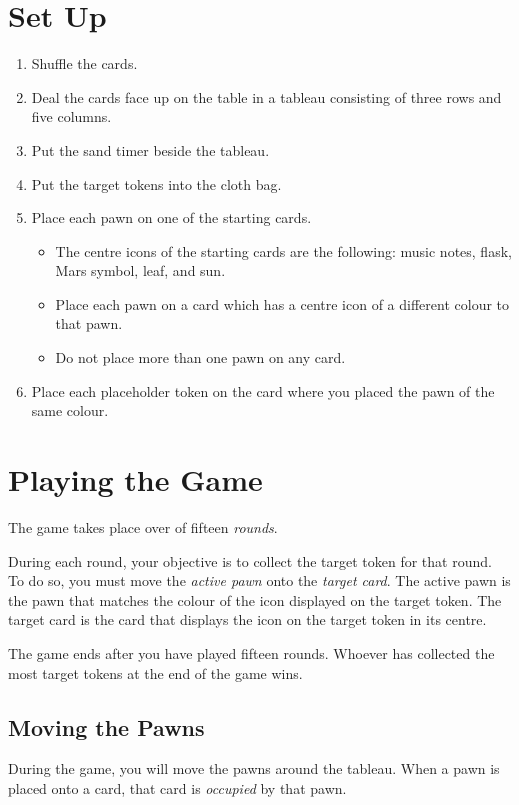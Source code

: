 \documentclass[a6paper, parskip=half, DIV=14, 10pt]{scrartcl}
\begin{document}
\section*{Set Up}
\begin{enumerate}[leftmargin=*]
	\item Shuffle the cards.
	\item Deal the cards face up on the table in a tableau consisting of three rows and five columns.
	\item Put the sand timer beside the tableau.
	\item Put the target tokens into the cloth bag.
	\item Place each pawn on one of the starting cards.
	\begin{itemize}[leftmargin=*]
	  \item The centre icons of the starting cards are the following: music notes, flask, Mars symbol, leaf, and sun.
	  \item Place each pawn on a card which has a centre icon of a different colour to that pawn.
	  \item Do not place more than one pawn on any card.
	\end{itemize}
	\item Place each placeholder token on the card where you placed the pawn of the same colour.
\end{enumerate}

\newpage

\section*{Playing the Game}
The game takes place over of fifteen \emph{rounds}.

During each round, your objective is to collect the target token for that round. To do so, you must move the \emph{active pawn} onto the \emph{target card}. The active pawn is the pawn that matches the colour of the icon displayed on the target token. The target card is the card that displays the icon on the target token in its centre.

The game ends after you have played fifteen rounds. Whoever has collected the most target tokens at the end of the game wins.

\subsection*{Moving the Pawns}
During the game, you will move the pawns around the tableau. When a pawn is placed onto a card, that card is \emph{occupied} by that pawn.
\end{document}
